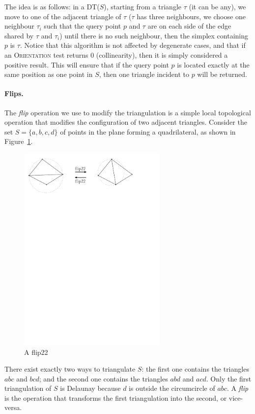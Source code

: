 The idea is as follows: in a DT($S$), starting from a triangle $\tau$ (it can be any), we move to one of the adjacent triangle of $\tau$ ($\tau$ has three neighbours, we choose one neighbour $\tau_i$ such that the query point $p$ and $\tau$ are on each side of the edge shared by $\tau$ and $\tau_i$) until there is no such neighbour, then the simplex containing $p$ is $\tau$.
Notice that this algorithm is not affected by degenerate cases, and that if an \textrm{O}\textsc{rientation} test returns 0 (collinearity), then it is simply considered a positive result. 
This will ensure that if the query point $p$ is located exactly at the same position as one point in $S$, then one triangle incident to $p$ will be returned.


\paragraph{Flips.}The \emph{flip} operation we use to modify the triangulation is a simple local topological operation that modifies the configuration of two adjacent triangles. 
Consider the set $S = \{a, b, c, d\}$ of points in the plane forming a quadrilateral, as shown in Figure~\ref{p:flip22}. 
\begin{figure}
  \centering
  \includegraphics[width=0.65\textwidth]{figs/flip22}
  \caption{A flip22}
\label{p:flip22}
\end{figure}
There exist exactly two ways to triangulate $S$: the first one contains the triangles $abc$ and $bcd$; and the second one contains the triangles $abd$ and $acd$. 
Only the first triangulation of $S$ is Delaunay because $d$ is outside the circumcircle of $abc$. 
A \emph{flip} is the operation that transforms the first triangulation into the second, or vice-versa.


